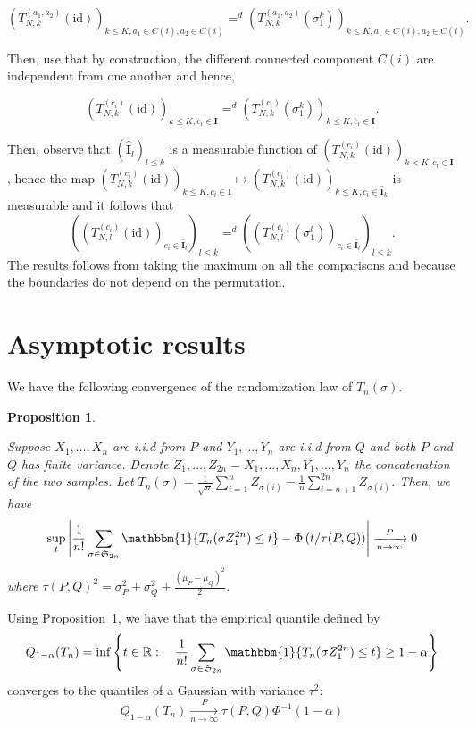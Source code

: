 \documentclass{article}
\theoremstyle{plain}
\newtheorem{Proposition}{Proposition}
\theoremstyle{remark}
\newcommand{\R}{\mathbb{R}}
\renewcommand{\S}{\mathfrak{S}}
\newcommand{\1}{\mathbbm{1}}
\newcommand{\id}{\mathrm{id}}
\newcommand{\todoT}[1]{\todo[inline,color=blue!40]{{\textbf{T:}~}#1}}
\numberwithin{equation}{section}
\begin{document}
$$(T_{N,k}^{(a_1,a_2)}(\id))_{ k\le K, a_1 \in C(i), a_2 \in C(i)}=^d(T_{N,k}^{(a_1,a_2)}(\sigma_1^k))_{ k\le K, a_1 \in C(i), a_2 \in C(i)}.$$

Then, use that by construction, the different connected component $C(i)$ are independent from one another and hence, 

$$(T_{N,k}^{(c_i)}(\id))_{ k\le K, c_i \in \textbf{I}}=^d(T_{N,k}^{(c_i)}(\sigma_1^k))_{ k\le K,  c_i \in \textbf{I}}.$$

Then, observe that $(\widehat{\textbf{I}}_l)_{l\le k}$ is a measurable function of $(T_{N,k}^{(c_i)}(\id))_{ k< K, c_i \in \textbf{I}}$, hence the map $(T_{N,k}^{(c_i)}(\id))_{ k\le K, c_i \in \textbf{I}} \mapsto (T_{N,k}^{(c_i)}(\id))_{ k\le K, c_i \in \widehat{\textbf{I}}_k}$ is measurable and it follows that 
$$((T_{N,l}^{(c_i)}(\id))_{ c_i \in \widehat{\textbf{I}}_l})_{l \le k}=^d((T_{N,l}^{(c_i)}(\sigma_1^l))_{ c_i \in \widehat{\textbf{I}}_l})_{l \le k}.$$
The results follows from taking the maximum on all the comparisons and because the boundaries do not depend on the permutation.
\section{Asymptotic results}
\todoT{TODO: Change notations}
We have the following convergence of the randomization law of $T_n(\sigma)$.
\begin{Proposition}\label{prop:asym_perm_test}

Suppose $X_1,\dots,X_n$ are i.i.d from $P$ and $Y_1,\dots,Y_n$ are i.i.d from $Q$ and both $P$ and $Q$ has finite variance. Denote $Z_1,\dots,Z_{2n}=X_1,\dots,X_n, Y_1,\dots,Y_n$ the concatenation of the two samples. Let $T_n(\sigma)=\frac{1}{\sqrt{n}}\sum_{i=1}^n Z_{\sigma(i)} -\frac{1}{n}\sum_{i=n+1}^{2n} Z_{\sigma(i)}$.
Then, we have
$$\sup_{t}\left|\frac{1}{n!}\sum_{\sigma \in \S_{2n}} \1\{T_n(\sigma Z_{1}^{2n}) \le t\}- \Phi\left(t/\tau(P,Q) \right)\right|\xrightarrow[n \to \infty]{P} 0$$
where $\tau(P,Q)^2=\sigma_P^2+\sigma_Q^2+\frac{(\mu_P- \mu_Q)^2}{2} $.
\end{Proposition}

Using Proposition~\ref{prop:asym_perm_test}, we have that the empirical quantile defined by
$$Q_{1-\alpha}(T_n) = \inf\left\{t \in \R:\quad \frac{1}{n!}\sum_{\sigma \in \S_{2n}} \1\{T_n(\sigma Z_{1}^{2n}) \le t\} \ge 1-\alpha\right\} $$
converges to the quantiles of a Gaussian with variance $\tau^2$:
$$Q_{1-\alpha}(T_n)\xrightarrow[n \to \infty]{P} \tau(P,Q)\Phi^{-1}(1-\alpha) $$
\end{document}
